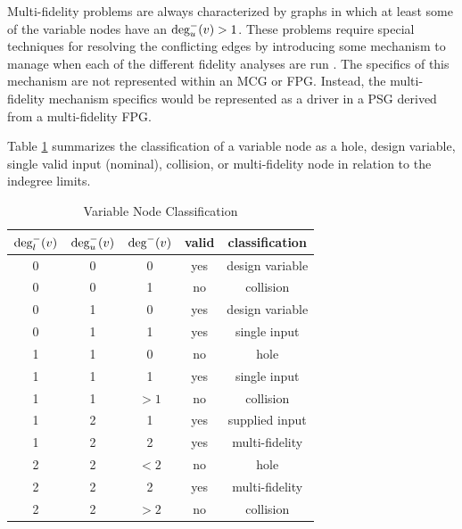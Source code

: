   Multi-fidelity problems are always characterized by graphs in which at least some of the variable 
  nodes have an $\textrm{deg}^-_u(v) > 1$. These problems require 
  special techniques for resolving the conflicting edges by introducing some mechanism
  to manage when each of the different fidelity analyses are 
  run \cite{march2012provably,alexandrov2001approximation,Huang_Allen_Notz_Miller_2006}.
  The specifics of this mechanism are not represented within an MCG or 
  FPG. Instead, the multi-fidelity mechanism specifics would be represented as a 
  driver in a PSG derived from a multi-fidelity FPG. 

Table \ref{t:variable node classification} summarizes the classification of a variable 
node as a hole, design variable, single valid input (nominal), collision, or 
multi-fidelity node in relation to the indegree limits.

\begin{table}[htbp]
  \centering
  \caption{Variable Node Classification}
    \begin{tabular}{ccccc}
    \toprule
    $\textrm{deg}^-_l(v)$ & $\textrm{deg}^-_u(v)$ & $\textrm{deg}^-(v)$ & valid & classification \\
    \midrule
    0     & 0     & 0     & yes   & design variable \\
    0     & 0     & 1     & no   & collision \\
    0     & 1     & 0     & yes   & design variable \\
    0     & 1     & 1     & yes   & single input \\
    1     & 1     & 0     & no    & hole \\
    1     & 1     & 1     & yes   & single input \\
    1     & 1     & $>1$ & no    & collision \\
    1     & 2     & 1     & yes   & supplied input \\
    1     & 2     & 2     & yes   & multi-fidelity \\
    2     & 2     & $<2$ & no    & hole \\
    2     & 2     & 2     & yes   & multi-fidelity \\
    2     & 2     & $>2$     & no   & collision \\
    \bottomrule
    \end{tabular}%
  \label{t:variable node classification}%
\end{table}%


